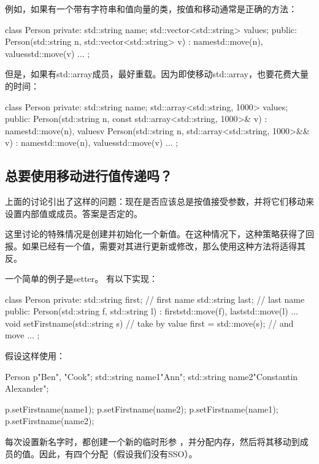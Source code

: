例如，如果有一个带有字符串和值向量的类，按值和移动通常是正确的方法：

\begin{cppcode}
class Person {
private:
	std::string name;
	std::vector<std::string> values;
public:
	Person(std::string n, std::vector<std::string> v)
	: name{std::move(n)}, values{std::move(v)} {
	}
	...
};
\end{cppcode}

但是，如果有std::array成员，最好重载。因为即使移动std::array，也要花费大量的时间：

\begin{cppcode}
class Person {
private:
	std::string name;
	std::array<std::string, 1000> values;
public:
	Person(std::string n, const std::array<std::string, 1000>& v)
	: name{std::move(n)}, values{v} {
	}
	Person(std::string n, std::array<std::string, 1000>&& v)
	: name{std::move(n)}, values{std::move(v)} {
	}
	...
};
\end{cppcode}

\subsection{总要使用移动进行值传递吗？}

上面的讨论引出了这样的问题：现在是否应该总是按值接受参数，并将它们移动来设置内部值或成员。答案是否定的。

这里讨论的特殊情况是创建并初始化一个新值。在这种情况下，这种策略获得了回报。如果已经有一个值，需要对其进行更新或修改，那么使用这种方法将适得其反。

一个简单的例子是setter。 有以下实现：

\begin{cppcode}
class Person {
private:
	std::string first; // first name
	std::string last; // last name
public:
	Person(std::string f, std::string l)
	: first{std::move(f)}, last{std::move(l)} {
	}
	...
	void setFirstname(std::string s) { // take by value
		first = std::move(s); // and move
	}
	...
};
\end{cppcode}

假设这样使用：

\begin{cppcode}
Person p{"Ben", "Cook"};
std::string name1{"Ann"};
std::string name2{"Constantin Alexander"};

p.setFirstname(name1);
p.setFirstname(name2);
p.setFirstname(name1);
p.setFirstname(name2);
\end{cppcode}

每次设置新名字时，都创建一个新的临时形参 ，并分配内存，然后将其移动到成员的值。因此，有四个分配（假设我们没有SSO）。


